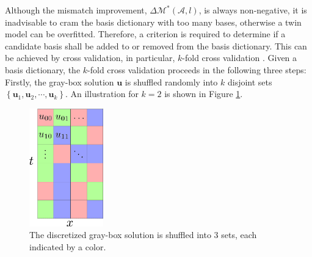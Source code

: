 Although the mismatch improvement, $\Delta \mathcal{M}^*\left(\mathcal{A}, l\right)$, is always
non-negative, it is inadvisable to cram the basis dictionary with too many bases,
otherwise a twin model can be overfitted.
Therefore, a criterion is required to determine if a candidate basis shall be added to or 
removed from the basis dictionary. This can be achieved by cross validation,
in particular, $k$-fold cross validation \cite{cross validation}.
Given a basis dictionary, the $k$-fold cross validation proceeds in the following three steps:
Firstly, the gray-box solution $\boldsymbol{u}$ is shuffled randomly into $k$ disjoint sets
$\left\{\boldsymbol{u}_1 , \boldsymbol{u}_2, \cdots, \boldsymbol{u}_k\right\}$.
An illustration for $k=2$ is shown in Figure \ref{fig: shuffle}.
\begin{figure}[htbp]
    \begin{center}
        \includegraphics[width=3.2cm]{../shuffle_1.png}
        \caption{The discretized 
                 gray-box solution is shuffled into $3$ sets, each indicated by a color.}
        \label{fig: shuffle}
    \end{center}
\end{figure}

